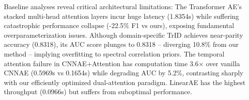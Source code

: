\documentclass[conference]{IEEEtran}
\begin{document}
\begin{table}[t]
    \caption{Performance Comparison of DualAttnWaveNet Against Baseline Models}
    \label{tab:main_results}
    \centering
\end{table}

Baseline analyses reveal critical architectural limitations: The Transformer AE's stacked multi-head attention layers incur huge latency (1.8354s) while suffering catastrophic performance collapse (-22.5\% F1 vs ours), exposing fundamental overparameterization issues. Although domain-specific TrID achieves near-parity accuracy (0.8318), its AUC score plunges to 0.8318 – diverging 10.8\% from our method – implying overfitting to spectral correlation priors. The temporal attention failure in CNNAE+Attention has computation time 3.6× over vanilla CNNAE (0.5969s vs 0.1654s) while degrading AUC by 5.2\%, contrasting sharply with our efficiently optimized dual-attention paradigm. LinearAE has the highest throughput (0.0966s) but suffers from suboptimal performance.
\end{document}
